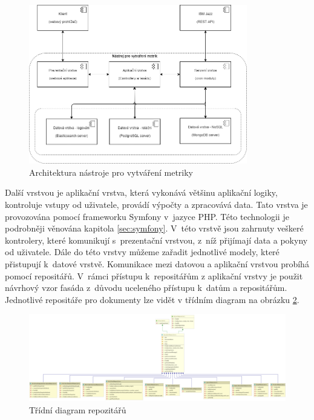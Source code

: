\documentclass[czech,master]{diploma}
\begin{document}
\begin{figure}[!ht]
    \centering
    \includegraphics[width=0.85\textwidth]{Diplomka/Figures/architektura.png}
    \caption{Architektura nástroje pro vytváření metriky}
    \label{fig:architektura_nastroje}
\end{figure}

Další vrstvou je aplikační vrstva, která vykonává většinu aplikační logiky, kontroluje vstupy od uživatele, provádí výpočty a zpracovává data. Tato vrstva je provozována pomocí frameworku Symfony v~jazyce PHP. Této technologii je podrobněji věnována kapitola \ref{sec:symfony}. V~této vrstvě jsou zahrnuty veškeré kontrolery, které komunikují s~prezentační vrstvou, z~níž přijímají data a pokyny od uživatele. Dále do této vrstvy můžeme zařadit jednotlivé modely, které přistupují k~datové vrstvě. Komunikace mezi datovou a aplikační vrstvou probíhá pomocí repositářů. V~rámci přístupu k~repositářům z aplikační vrstvy je použit návrhový vzor fasáda z~důvodu uceleného přístupu k~datům a repositářům. Jednotlivé repositáře pro dokumenty lze vidět v třídním diagram na obrázku \ref{fig:class_diagram_repository}.

\begin{figure}[!ht]
    \centering
    \includegraphics[width=1\textwidth]{Diplomka/Figures/class_diagram_repository.png}
    \caption{Třídní diagram repozitářů}
    \label{fig:class_diagram_repository}
\end{figure}
\end{document}
